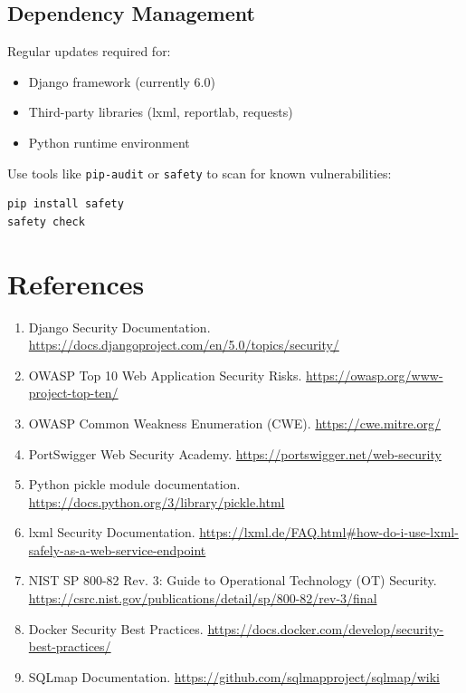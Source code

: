 \documentclass[12pt,a4paper]{article}
\begin{document}
\subsection{Dependency Management}

Regular updates required for:
\begin{itemize}[leftmargin=*]
    \item Django framework (currently 6.0)
    \item Third-party libraries (lxml, reportlab, requests)
    \item Python runtime environment
\end{itemize}

Use tools like \texttt{pip-audit} or \texttt{safety} to scan for known vulnerabilities:

\begin{lstlisting}[language=bash]
pip install safety
safety check
\end{lstlisting}

\newpage

\section{References}

\begin{enumerate}[leftmargin=*]
    \item Django Security Documentation. \url{https://docs.djangoproject.com/en/5.0/topics/security/}
    
    \item OWASP Top 10 Web Application Security Risks. \url{https://owasp.org/www-project-top-ten/}
    
    \item OWASP Common Weakness Enumeration (CWE). \url{https://cwe.mitre.org/}
    
    \item PortSwigger Web Security Academy. \url{https://portswigger.net/web-security}
    
    \item Python pickle module documentation. \url{https://docs.python.org/3/library/pickle.html}
    
    \item lxml Security Documentation. \url{https://lxml.de/FAQ.html#how-do-i-use-lxml-safely-as-a-web-service-endpoint}
    
    \item NIST SP 800-82 Rev. 3: Guide to Operational Technology (OT) Security. \url{https://csrc.nist.gov/publications/detail/sp/800-82/rev-3/final}
    
    \item Docker Security Best Practices. \url{https://docs.docker.com/develop/security-best-practices/}
    
    \item SQLmap Documentation. \url{https://github.com/sqlmapproject/sqlmap/wiki}
\end{enumerate}
\end{document}
